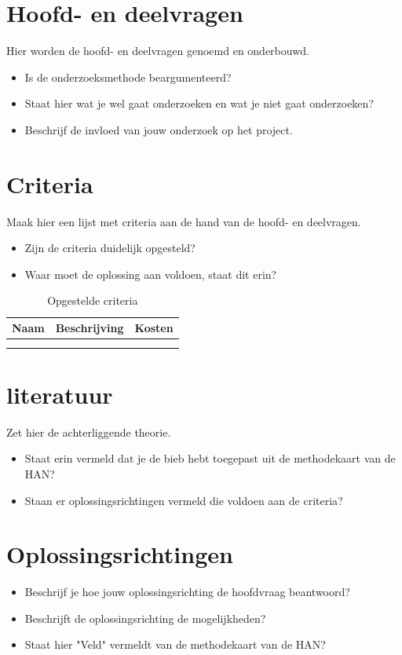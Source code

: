 \documentclass[a4paper, 11pt, oneside]{report}
\begin{document}
\chapter{Hoofd- en deelvragen}
Hier worden de hoofd- en deelvragen genoemd en onderbouwd.

\begin{itemize}
\item Is de onderzoeksmethode beargumenteerd?
\item Staat hier wat je wel gaat onderzoeken en wat je niet gaat onderzoeken?
\item Beschrijf de invloed van jouw onderzoek op het project.
\end{itemize}

\chapter{Criteria}
Maak hier een lijst met criteria aan de hand van de hoofd- en deelvragen.
\begin{itemize}
	
\item Zijn de criteria duidelijk opgesteld?
\item Waar moet de oplossing aan voldoen, staat dit erin?
\end{itemize}

\begin{table}[H]
	\centering
	\begin{tabular}{|l|l|l|}
		\hline
		\rowcolor[HTML]{C0C0C0} 
		Naam & Beschrijving & Kosten \\ \hline
		&              &        \\ \hline
		&              &        \\ \hline
	\end{tabular}
	\caption{Opgestelde criteria}
	\label{tab:criteria}
\end{table}

\chapter{literatuur}
Zet hier de achterliggende theorie.
\begin{itemize}
\item Staat erin vermeld dat je de bieb hebt toegepast uit de methodekaart van de HAN?
\item Staan er oplossingsrichtingen vermeld die voldoen aan de criteria?
\end{itemize}


\chapter{Oplossingsrichtingen}
\begin{itemize}
\item Beschrijf je hoe jouw oplossingsrichting de hoofdvraag beantwoord?
\item Beschrijft de oplossingsrichting de mogelijkheden?
\item Staat hier "Veld" vermeldt van de methodekaart van de HAN?
\end{itemize}
\end{document}
